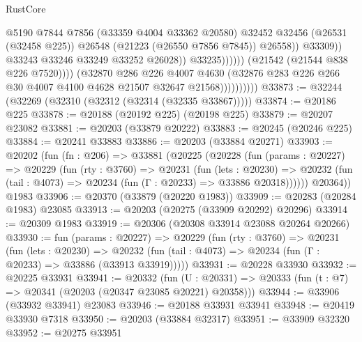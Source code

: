\begin{lexlean}{RustCore}
\begin{coremodule}
                                                @5190
                                                @7844
                                                @7856
                                                (@33359 @4004 @33362 @20580)
                                                @32452
                                                @32456
                                                (@26531 (@32458 @225))
                                                @26548
                                                (@21223 (@26550 @7856 @7845))
                                                @26558))
                                            @33309))
                                        @33243
                                        @33246
                                        @33249
                                        @33252
                                        @26028))
                                    @33235))))))
                        (@21542 (@21544 @838 @226 @7520))))
                    (@32870
                      @286
                      @226
                      @4007
                      @4630
                      (@32876 @283 @226 @266 @30 @4007 @4100 @4628 @21507 @32647 @21568))))))))))
@33873 := @32244 (@32269 (@32310 (@32312 (@32314 (@32335 @33867)))))
@33874 := @20186 @225
@33878 := @20188 (@20192 @225) (@20198 @225)
@33879 := @20207 @23082
@33881 := @20203 (@33879 @20222)
@33883 := @20245 (@20246 @225)
@33884 := @20241 @33883
@33886 := @20203 (@33884 @20271)
@33903 := @20202
    (fun (fn : @206) =>
    @33881
      (@20225
        (@20228
          (fun (params : @20227) =>
          @20229
            (fun (rty : @3760) =>
            @20231
              (fun (lets : @20230) =>
              @20232 (fun (tail : @4073) => @20234 (fun (Γ : @20233) => @33886 @20318))))))
        @20364))
    @1983
@33906 := @20370 (@33879 (@20220 @1983))
@33909 := @20283 (@20284 @1983) @23085
@33913 := @20203 (@20275 (@33909 @20292) @20296)
@33914 := @20309 @1983
@33919 := @20306 (@20308 @33914 @23088 @20264 @20266)
@33930 := fun (params : @20227) =>
  @20229
    (fun (rty : @3760) =>
    @20231
      (fun (lets : @20230) =>
      @20232 (fun (tail : @4073) => @20234 (fun (Γ : @20233) => @33886 (@33913 @33919)))))
@33931 := @20228 @33930
@33932 := @20225 @33931
@33941 := @20332
    (fun (U : @20331) => @20333 (fun (t : @7) => @20341 (@20203 (@20347 @23085 @20221) @20358)))
@33944 := @33906 (@33932 @33941) @23083
@33946 := @20188 @33931 @33941
@33948 := @20419 @33930 @7318
@33950 := @20203 (@33884 @32317)
@33951 := @33909 @32320
@33952 := @20275 @33951

\end{coremodule}
\end{lexlean}
